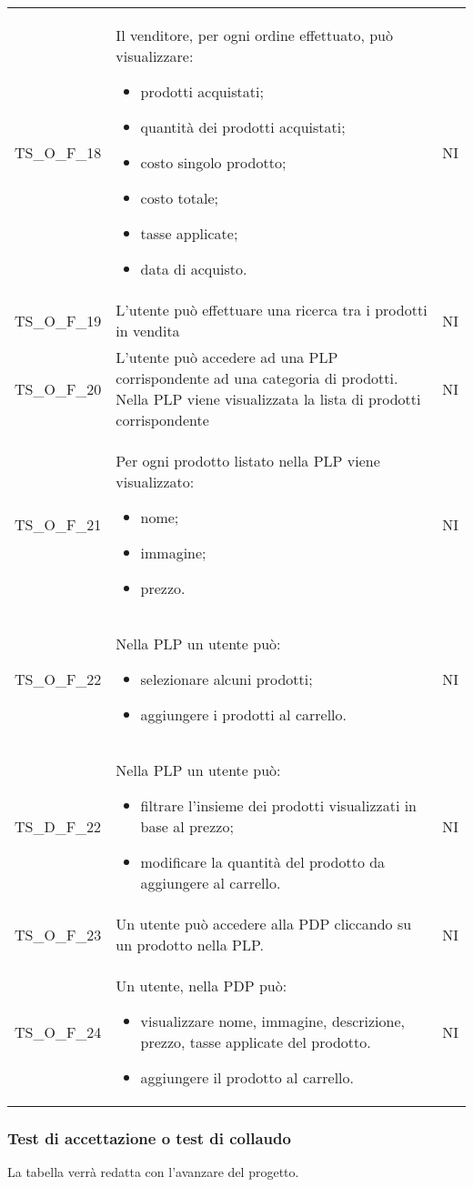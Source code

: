 {\begin{longtable}{C{3cm} C{10.2cm} C{1.5cm}}
TS\_O\_F\_18 & Il venditore, per ogni ordine effettuato, può visualizzare:
\begin{itemize}
	\item prodotti acquistati;
	\item quantità dei prodotti acquistati;
	\item costo singolo prodotto;
	\item costo totale;
	\item tasse applicate;
	\item data di acquisto.
\end{itemize}
& NI\\





TS\_O\_F\_19 & L'utente può effettuare una ricerca tra i prodotti in vendita & NI\\

TS\_O\_F\_20 & L'utente può accedere ad una PLP corrispondente ad una categoria di prodotti. Nella PLP viene visualizzata la lista di prodotti corrispondente & NI\\

TS\_O\_F\_21 & Per ogni prodotto listato nella PLP viene visualizzato:
\begin{itemize}
	\item nome;
	\item immagine;
	\item prezzo.
\end{itemize} & NI\\

TS\_O\_F\_22 & Nella PLP un utente può:
\begin{itemize}
	\item selezionare alcuni prodotti;
	\item aggiungere i prodotti al carrello.
\end{itemize} & NI\\

TS\_D\_F\_22 & Nella PLP un utente può:
\begin{itemize}
	\item filtrare l'insieme dei prodotti visualizzati in base al prezzo;
	\item modificare la quantità del prodotto da aggiungere al carrello.
\end{itemize} & NI\\

TS\_O\_F\_23 & Un utente può accedere alla PDP cliccando su un prodotto nella PLP. & NI\\

TS\_O\_F\_24 & Un utente, nella PDP può:
\begin{itemize}
	\item visualizzare nome, immagine, descrizione, prezzo, tasse applicate del prodotto.
	\item aggiungere il prodotto al carrello.
\end{itemize} & NI\\



\end{longtable}


}
\subsubsection{Test di accettazione o test di collaudo}
La tabella verrà redatta con l'avanzare del progetto.